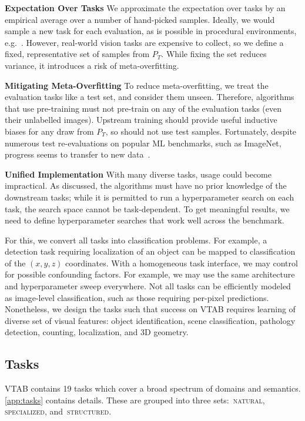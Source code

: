 \documentclass{article}
\newcommand{\myparagraph}[1]{\noindent\textbf{#1}\quad}
\def\t{T}
\DeclareRobustCommand{\taskNatural}{\raisebox{0.5pt}{\tikz{\fill[natural] (0cm,0cm) circle (.5ex);}}\,\textsc{natural}}
\DeclareRobustCommand{\taskSpecialized}{\raisebox{0.5pt}{\tikz{\fill[specialized] (0,0) circle (.5ex);}}\,\textsc{specialized}}
\DeclareRobustCommand{\taskStructured}{\raisebox{0.5pt}{\tikz{\fill[structured] (0,0) circle (.5ex);}}\,\textsc{structured}}
\newcommand{\imagenet}{ImageNet}
\begin{document}
\myparagraph{Expectation Over Tasks}
We approximate the expectation over tasks by an empirical average over a number of hand-picked samples.
Ideally, we would sample a new task for each evaluation, as is possible in procedural environments, e.g.~\citep{finn2017}.
However, real-world vision tasks are expensive to collect, so we define a fixed, representative set of samples from $P_{\t}$.
While fixing the set reduces variance, it introduces a risk of meta-overfitting.

\myparagraph{Mitigating Meta-Overfitting}
To reduce meta-overfitting, we treat the evaluation tasks like a test set, and consider them unseen.
Therefore, algorithms that use pre-training must not pre-train on any of the evaluation tasks (even their unlabelled images).
Upstream training should provide useful inductive biases for any draw from $P_{\t}$, so should not use test samples. 
Fortunately, despite numerous test re-evaluations on popular ML benchmarks, such as \imagenet{}, progress seems to transfer to new data~\citep{recht18cifar,recht19imagenet,kornblith2018better}.

\myparagraph{Unified Implementation}
With many diverse tasks, usage could become impractical.
As discussed, the algorithms must have no prior knowledge of the downstream tasks;
while it is permitted to run a hyperparameter search on each task, the search space cannot be task-dependent.
To get meaningful results, we need to define hyperparameter searches that work well across the benchmark.

For this, we convert all tasks into classification problems.
For example, a detection task requiring localization of an object can be mapped to classification of the $(x,y,z)$ coordinates.
With a homogeneous task interface, we may control for possible confounding factors.
For example, we may use the same architecture and hyperparameter sweep everywhere.
Not all tasks can be efficiently modeled as image-level classification, such as those requiring per-pixel predictions.
Nonetheless, we design the tasks such that success on VTAB requires learning of diverse set of visual features:
object identification, scene classification, pathology detection, counting, localization, and 3D geometry.


\subsection{Tasks\label{sec:tasks}}
VTAB contains 19  tasks which cover a broad spectrum of domains and semantics. \cref{app:tasks} contains details. These are grouped into three sets: \taskNatural{}, \taskSpecialized{}, and \taskStructured{}.
\end{document}
